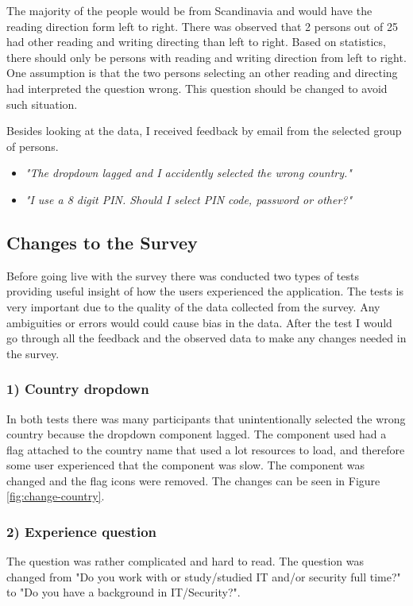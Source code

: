     The majority of the people would be from Scandinavia and would have the reading direction form left to right. There was observed that 2 persons out of 25 had other reading and writing directing than left to right. Based on statistics, there should only be persons with reading and writing direction from left to right. One assumption is that the two persons selecting an other reading and directing had interpreted the question wrong. This question should be changed to avoid such situation. 

    Besides looking at the data, I received feedback by email from the selected group of persons.

    {\renewcommand\labelitemi{}
    \begin{itemize}
      \item {\it "The dropdown lagged and I accidently selected the wrong country."}
      \item {\it "I use a 8 digit PIN. Should I select PIN code, password or other?"}
    \end{itemize}}


  	\subsection{Changes to the Survey}

  	Before going live with the survey there was conducted two types of tests providing useful insight of how the users experienced the application. The tests is very important due to the quality of the data collected from the survey. Any ambiguities or errors would could cause bias in the data. After the test I would go through all the feedback and the observed data to make any changes needed in the survey.

    \subsubsection*{1) Country dropdown}
    In both tests there was many participants that unintentionally selected the wrong country because the dropdown component lagged. The component used had a flag attached to the country name that used a lot resources to load, and therefore some user experienced that the component was slow. The component was changed and the flag icons were removed. The changes can be seen in Figure \ref{fig:change-country}.

    \subsubsection*{2) Experience question}
    The question was rather complicated and hard to read. The question was changed from "Do you work with or study/studied IT and/or security full time?" to "Do you have a background in IT/Security?".
      
